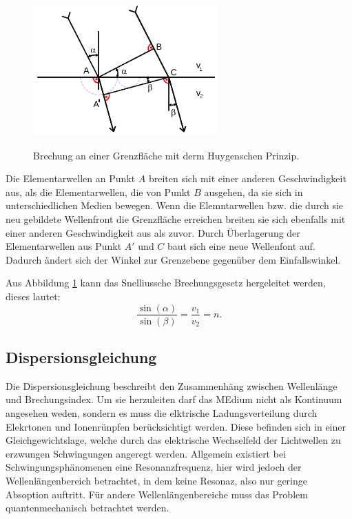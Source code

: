 \begin{figure}[H]
  \centering
  \includegraphics[height=5cm]{huygen.png}
  \caption{Brechung an einer Grenzfläche mit derm Huygenschen Prinzip.}
  \label{fig:huyg}
  \cite{skript}
\end{figure}

Die Elementarwellen an Punkt $A$ breiten sich mit einer anderen Geschwindigkeit
aus, als die Elementarwellen, die von Punkt $B$ ausgehen, da sie sich in
unterschiedlichen Medien bewegen. Wenn die Elemntarwellen bzw. die
durch sie neu gebildete Wellenfront die Grenzfläche erreichen breiten sie sich
ebenfalls mit einer anderen Geschwindigkeit aus als zuvor. Durch Überlagerung
der Elementarwellen aus Punkt $A'$ und $C$ baut sich eine neue Wellenfont auf.
Dadurch ändert sich der Winkel zur Grenzebene gegenüber dem Einfallswinkel.

Aus Abbildung \ref{fig:huyg} kann das Snelliussche Brechungsgesetz hergeleitet werden,
dieses lautet:
\begin{equation}
  \frac{\sin{(\alpha)}}{\sin{(\beta)}}=\frac{v_1}{v_2}=n.
  \label{brechung}
\end{equation}

\subsection{Dispersionsgleichung}
Die Dispersionsgleichung beschreibt den Zusammenhäng zwischen Wellenlänge
und Brechungsindex. Um sie herzuleiten darf das MEdium nicht als Kontinuum
angesehen weden, sondern es muss die elktrische Ladungsverteilung durch
Elekrtonen und Ionenrünpfen
berücksichtigt werden. Diese befinden sich in einer Gleichgewichtslage, welche
durch das elektrische Wechselfeld der Lichtwellen zu erzwungen Schwingungen
angeregt werden. Allgemein existiert bei Schwingungsphänomenen eine Resonanzfrequenz,
hier wird jedoch der Wellenlängenbereich betrachtet, in dem keine
Resonaz, also nur geringe Absoption auftritt. Für andere Wellenlängenbereiche
muss das Problem quantenmechanisch betrachtet werden.

